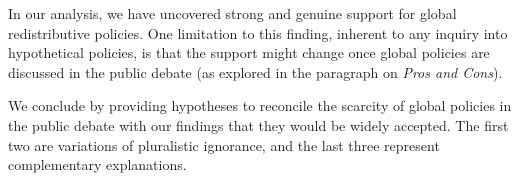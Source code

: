 \begin{bibunit}

In our analysis, we have uncovered strong and genuine support for global redistributive policies. One limitation to this finding, inherent to any inquiry into hypothetical policies, is that the support might change once global policies are discussed in the public debate (as explored in the paragraph on \textit{Pros and Cons}). 

We conclude by providing hypotheses to reconcile the scarcity of global policies in the public debate with our findings that they would be widely accepted. %
The first two are variations of pluralistic ignorance, and the last three represent complementary explanations. 


\end{bibunit}
